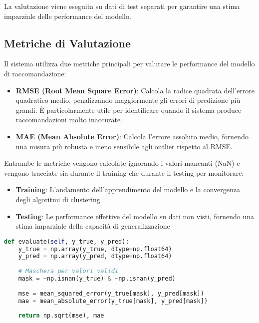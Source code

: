 La valutazione viene eseguita su dati di test separati per garantire una stima imparziale delle performance del modello.


\subsection{Metriche di Valutazione}

Il sistema utilizza due metriche principali per valutare le performance del modello di raccomandazione:

\begin{itemize}
    \item \textbf{RMSE (Root Mean Square Error)}: Calcola la radice quadrata dell'errore quadratico medio, penalizzando maggiormente gli errori di predizione più grandi. È particolarmente utile per identificare quando il sistema produce raccomandazioni molto inaccurate.
    
    \item \textbf{MAE (Mean Absolute Error)}: Calcola l'errore assoluto medio, fornendo una misura più robusta e meno sensibile agli outlier rispetto al RMSE.
\end{itemize}

Entrambe le metriche vengono calcolate ignorando i valori mancanti (NaN) e vengono tracciate sia durante il training che durante il testing per monitorare:
\begin{itemize}
    \item \textbf{Training}: L'andamento dell'apprendimento del modello e la convergenza degli algoritmi di clustering
    \item \textbf{Testing}: Le performance effettive del modello su dati non visti, fornendo una stima imparziale della capacità di generalizzazione
\end{itemize}

\begin{lstlisting}[language=Python, caption=Calcolo metriche di valutazione]
def evaluate(self, y_true, y_pred):
    y_true = np.array(y_true, dtype=np.float64)
    y_pred = np.array(y_pred, dtype=np.float64)
    
    # Maschera per valori validi
    mask = ~np.isnan(y_true) & ~np.isnan(y_pred)
    
    mse = mean_squared_error(y_true[mask], y_pred[mask])
    mae = mean_absolute_error(y_true[mask], y_pred[mask])
    
    return np.sqrt(mse), mae
\end{lstlisting}

